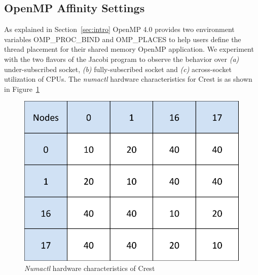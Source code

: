 \subsection{OpenMP Affinity Settings}
As explained in Section~\ref{sec:intro} OpenMP 4.0 provides two environment variables OMP\_PROC\_BIND and OMP\_PLACES to help users define the thread placement for their shared memory OpenMP application. We experiment with the two flavors of the Jacobi program to observe the behavior over \textit{(a)} under-subscribed socket, \textit{(b)} fully-subscribed socket and \textit{(c)} across-socket utilization of CPUs. The \textit{numactl} hardware characteristics for Crest is as shown in Figure~\ref{fig:crest}

\begin{figure}[h]
  \centering
  \includegraphics[height=0.3\textwidth]{./Images/crest.pdf}
       \caption{\textit{Numactl} hardware characteristics of Crest}
       \label{fig:crest}
\end{figure}
%
